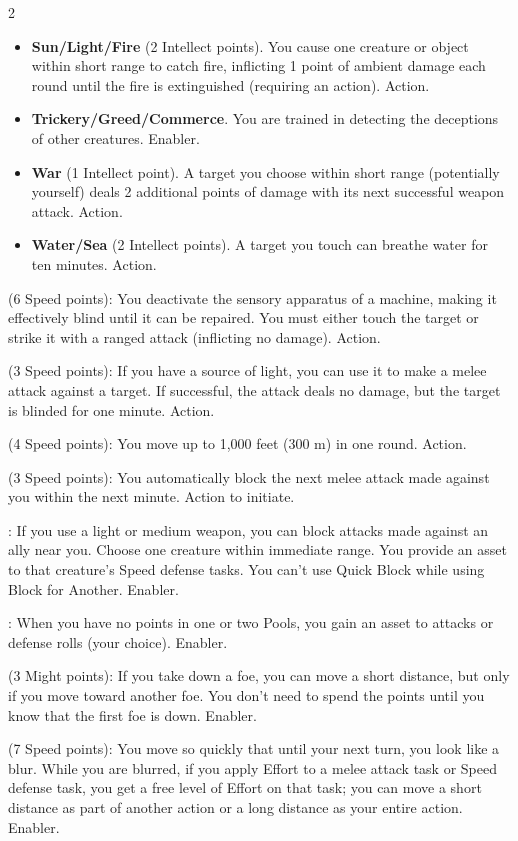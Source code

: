 \begin{multicols}{2}
\begin{itemize}
\item \textbf{Sun/Light/Fire} (2 Intellect points). You cause one creature or object within short range to catch fire, inflicting 1 point of ambient damage each round until the fire is extinguished (requiring an action). Action.
\item \textbf{Trickery/Greed/Commerce}. You are trained in detecting the deceptions of other creatures. Enabler. 
\item \textbf{War} (1 Intellect point). A target you choose within short range (potentially yourself) deals 2 additional points of damage with its next successful weapon attack. Action. 
\item \textbf{Water/Sea} (2 Intellect points). A target you touch can breathe water for ten minutes. Action. 
\end{itemize}

 (6 Speed points): You deactivate the sensory apparatus of a machine, making it effectively blind until it can be repaired. You must either touch the target or strike it with a ranged attack (inflicting no damage). Action. 

 (3 Speed points): If you have a source of light, you can use it to make a melee attack against a target. If successful, the attack deals no damage, but the target is blinded for one minute. Action. 

 (4 Speed points): You move up to 1,000 feet (300 m) in one round. Action. 

 (3 Speed points): You automatically block the next melee attack made against you within the next minute. Action to initiate. 

: If you use a light or medium weapon, you can block attacks made against an ally near you. Choose one creature within immediate range. You provide an asset to that creature’s Speed defense tasks. You can’t use Quick Block while using Block for Another. Enabler. 

: When you have no points in one or two Pools, you gain an asset to attacks or defense rolls (your choice). Enabler. 

 (3 Might points): If you take down a foe, you can move a short distance, but only if you move toward another foe. You don’t need to spend the points until you know that the first foe is down. Enabler. 

 (7 Speed points): You move so quickly that until your next turn, you look like a blur. While you are blurred, if you apply Effort to a melee attack task or Speed defense task, you get a free level of Effort on that task; you can move a short distance as part of another action or a long distance as your entire action. Enabler.


\end{multicols}
